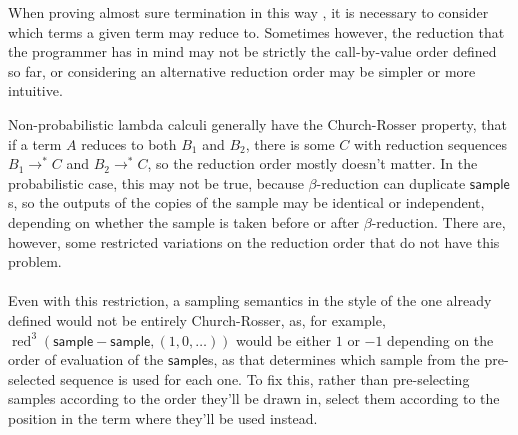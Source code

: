 \documentclass{article}
\newcommand{\tsample}{\textsf{sample}}
\DeclareMathOperator{\red}{red}
\theoremstyle{definition}
\theoremstyle{lemma}
\theoremstyle{remark}
\begin{document}
When proving almost sure termination in this way , it is necessary to consider which terms a given term may reduce to. Sometimes however, the reduction that the programmer has in mind may not be strictly the call-by-value order defined so far, or considering an alternative reduction order may be simpler or more intuitive.

Non-probabilistic lambda calculi generally have the Church-Rosser property, that if a term $A$ reduces to both $B_1$ and $B_2$, there is some $C$ with reduction sequences $B_1 \to^* C$ and $B_2 \to^* C$, so the reduction order mostly doesn't matter. In the probabilistic case, this may not be true, because $\beta$-reduction can duplicate $\tsample$s, so the outputs of the copies of the sample may be identical or independent, depending on whether the sample is taken before or after $\beta$-reduction. There are, however, some restricted variations on the reduction order that do not have this problem.

\paragraph{}
Even with this restriction, a sampling semantics in the style of the one already defined would not be entirely Church-Rosser, as, for example, $\red^3(\tsample - \tsample, (1,0,\dots))$ would be either $1$ or $-1$ depending on the order of evaluation of the $\tsample$s, as that determines which sample from the pre-selected sequence is used for each one. To fix this, rather than pre-selecting samples according to the order they'll be drawn in, select them according to the position in the term where they'll be used instead.
\end{document}
